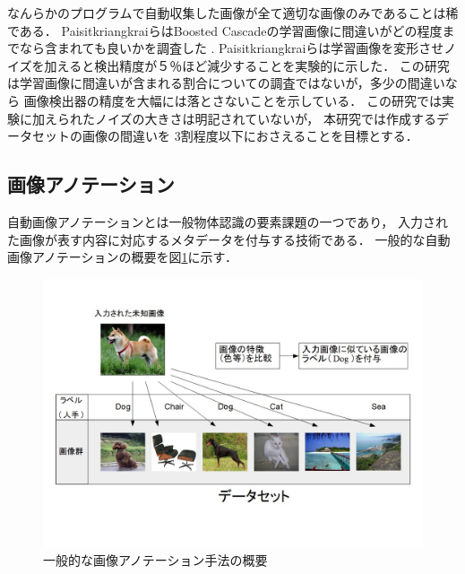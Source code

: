 \documentclass{deimj}
\begin{document}
なんらかのプログラムで自動収集した画像が全て適切な画像のみであることは稀である．
PaisitkriangkraiらはBoosted Cascadeの学習画像に間違いがどの程度までなら含まれても良いかを調査した
\cite{DBLP:journals/corr/abs-1009-5758}
.
Paisitkriangkraiらは学習画像を変形させノイズを加えると検出精度が５％ほど減少することを実験的に示した．
この研究は学習画像に間違いが含まれる割合についての調査ではないが，多少の間違いなら
画像検出器の精度を大幅には落とさないことを示している．
この研究では実験に加えられたノイズの大きさは明記されていないが，
本研究では作成するデータセットの画像の間違いを
3割程度以下におさえることを目標とする．

\subsection{画像アノテーション}

自動画像アノテーションとは一般物体認識の要素課題の一つであり，
入力された画像が表す内容に対応するメタデータを付与する技術である．
一般的な自動画像アノテーションの概要を図\ref{fig:abst}に示す．

\begin{figure}[tb]
 \begin{center}
  \includegraphics[scale=0.28]{gaiyou.jpg}
 \end{center}
 \caption{一般的な画像アノテーション手法の概要}
 \label{fig:abst}
\end{figure}
\end{document}
